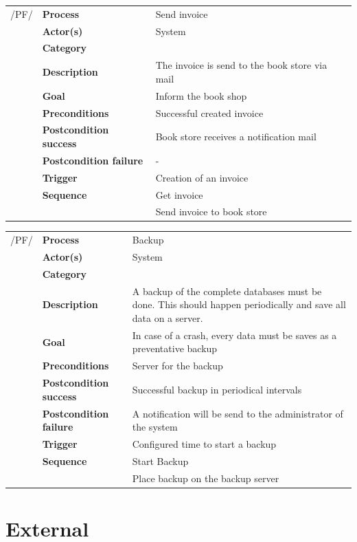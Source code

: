 \documentclass[11pt,a4paper,oneside,svgnames]{report}
\begin{document}
\noindent
\begin{tabular}{p{1.5cm}p{3cm}p{8cm}}
/PF/	& \textbf{Process} & Send invoice\\
		& \textbf{Actor(s)} & System\\
		& \textbf{Category} & \\
		& \textbf{Description}	 & The invoice is send to the book store via mail\\
		& \textbf{Goal} & Inform the book shop\\
		& \textbf{Preconditions} & Successful created invoice\\
		& \textbf{Postcondition success} & Book store receives a notification mail\\
		& \textbf{Postcondition failure} & -\\
		& \textbf{Trigger} & Creation of an invoice\\
		& \textbf{Sequence} & Get invoice\\
		& & Send invoice to book store
		
\hfill \\
\end{tabular}

\noindent
\begin{tabular}{p{1.5cm}p{3cm}p{8cm}}
/PF/	& \textbf{Process} & Backup\\
		& \textbf{Actor(s)} & System\\
		& \textbf{Category} & \\
		& \textbf{Description}	 & A backup of the complete databases must be done. This should happen periodically and save all data on a server.\\
		& \textbf{Goal} & In case of a crash, every data must be saves as a preventative backup\\
		& \textbf{Preconditions} & Server for the backup\\
		& \textbf{Postcondition success} & Successful backup in periodical intervals\\
		& \textbf{Postcondition failure} & A notification will be send to the administrator of the system\\
		& \textbf{Trigger} & Configured time to start a backup\\
		& \textbf{Sequence} & Start Backup\\
		& & Place backup on the backup server
		
\hfill \\
\end{tabular}


\section{External}
\end{document}
